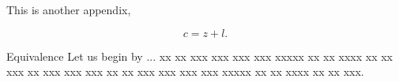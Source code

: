 \documentclass{amcs}
\begin{document}
\begin{appendices}{}

\noindent This is another appendix,

\begin{equation}
  c=z+l.
\end{equation}

\begin{lemma}{Equivalence} Let us begin by ... xx xx  xxx xxx xxx xxx xxxxx xx xx xxxx xx xx xxx  xx xxx xxx xxx xx xx  xxx xxx xxx xxx xxxxx  xx xx xxxx xx xx xxx.
\end{lemma}

\end{appendices}

\makeinfo
\end{document}
